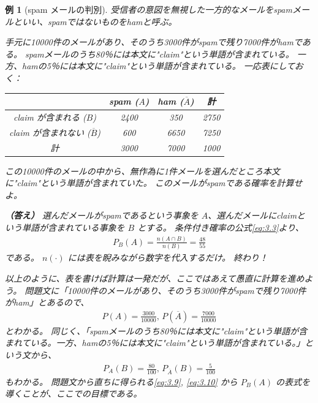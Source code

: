 \documentclass[12pt]{ltjsarticle}\usepackage{ifthen}\newcounter{enlarge}\setcounter{enlarge}{1}
\newtheorem{eg}{例}
\begin{document}
\begin{eg}[spam メールの判別] \label{eg:3.3}
  受信者の意図を無視した一方的なメールをspamメールといい、spamではないものをhamと呼ぶ。

  手元に10000件のメールがあり、そのうち3000件がspamで残り7000件がhamである。
  spamメールのうち80％には本文に"claim"という単語が含まれている。
  一方、hamの5％には本文に"claim"という単語が含まれている。
  一応表にしておく：

  \begin{center}
  \begin{tabular}{c|cc|c} \hline
    & spam  ($A$) & ham ($\overline{A}$) & 計 \\ \hline
    claim が含まれる ($B$) & 2400 & 350 & 2750 \\
    claim が含まれない ($\overline{B}$) & 600 & 6650 & 7250 \\ \hline
    計 & 3000 & 7000 & 1000 \\ \hline
  \end{tabular}
  \end{center}

  この10000件のメールの中から、無作為に1件メールを選んだところ本文に"claim"という単語が含まれていた。
  このメールがspamである確率を計算せよ。

  \textbf{（答え）}
  選んだメールがspamであるという事象を $A$、選んだメールにclaimという単語が含まれている事象を $B$ とする。
  条件付き確率の公式\eqref{eq:3.3}より、
  \begin{align}
    P_B (A) = \frac{n(A \cap B)}{n(B)} = \frac{48}{55} \label{eq:3.8}
  \end{align}
  である。
  $n(\cdot)$ には表を睨みながら数字を代入するだけ。
  終わり！
  
  以上のように、表を書けば計算は一発だが、ここではあえて愚直に計算を進めよう。
  問題文に「10000件のメールがあり、そのうち3000件がspamで残り7000件がham」とあるので、
  \begin{align} 
    P(A) = \frac{3000}{10000},\, P(\overline{A}) = \frac{7000}{10000} \label{eq:3.9}
  \end{align}
  とわかる。
  同じく、「spamメールのうち80％には本文に"claim"という単語が含まれている。一方、hamの5％には本文に"claim"という単語が含まれている。」という文から、
  \begin{align} 
    P_A (B) = \frac{80}{100},\, P_{\overline{A}} (B) = \frac{5}{100} \label{eq:3.10}
  \end{align}
  もわかる。
  問題文から直ちに得られる\eqref{eq:3.9}, \eqref{eq:3.10} から $P_B (A)$ の表式を導くことが、ここでの目標である。


\end{eg}
\end{document}
